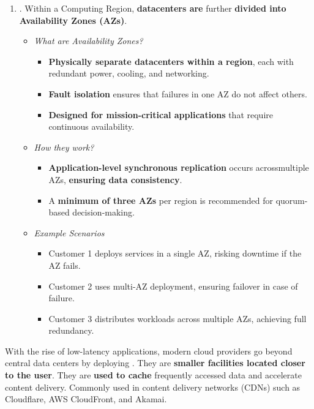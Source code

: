 \begin{enumerate}
    \item {}. Within a Computing Region, \textbf{datacenters are} further \textbf{divided into Availability Zones (AZs)}.
    \begin{itemize}
        \item \emph{What are Availability Zones?}
        \begin{itemize}
            \item \textbf{Physically separate datacenters within a region}, each with redundant power, cooling, and networking.
            \item \textbf{Fault isolation} ensures that failures in one AZ do not affect others.
            \item \textbf{Designed for mission-critical applications} that require continuous availability.
        \end{itemize}
        \item \emph{How they work?}
        \begin{itemize}
            \item \textbf{Application-level synchronous replication} occurs across\break multiple AZs, \textbf{ensuring data consistency}.
            \item A \textbf{minimum of three AZs} per region is recommended for quorum-based decision-making.
        \end{itemize}
        \item \emph{Example Scenarios}
        \begin{itemize}
            \item Customer 1 deploys services in a single AZ, risking downtime if the AZ fails.
            \item Customer 2 uses multi-AZ deployment, ensuring failover in case of failure.
            \item Customer 3 distributes workloads across multiple AZs, achieving full redundancy.
        \end{itemize}
    \end{itemize}
\end{enumerate}
With the rise of low-latency applications, modern cloud providers go beyond central data centers by deploying . They are \textbf{smaller facilities located closer to the user}. They are \textbf{used to cache} frequently accessed data and accelerate content delivery. Commonly used in content delivery networks (CDNs) such as Cloudflare, AWS CloudFront, and Akamai.

